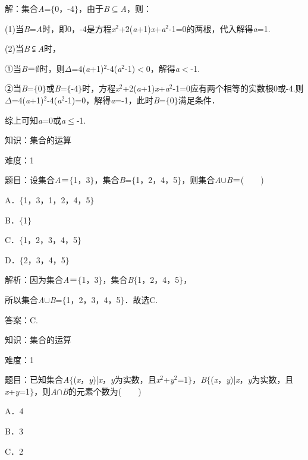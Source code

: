 \documentclass{article} %
\begin{document}
解：集合\textit{A}=$\mathrm{\{}$0，-4$\mathrm{\}}$，由于\textit{B}$\mathrm{\subseteq}$\textit{A}，则：

(1)当\textit{B}=\textit{A}时，即0，-4是方程\textit{x}${}^{2}$+2(\textit{a}+1)\textit{x}+\textit{a}${}^{2}$-1=0的两根，代入解得\textit{a}=1.

(2)当\textit{B}$\subsetneqq$\textit{A}时，

①当\textit{B}＝$\mathrm{\emptyset}$时，则$\Delta$=4(\textit{a}+1)${}^{2}$-4(\textit{a}${}^{2}$-1)$\mathrm{<}$0，解得\textit{a}$\mathrm{<}$-1.

②当\textit{B}=$\mathrm{\{}$0$\mathrm{\}}$或\textit{B}=$\mathrm{\{}$-4$\mathrm{\}}$时，方程\textit{x}${}^{2}$+2(\textit{a}+1)\textit{x}+\textit{a}${}^{2}$-1=0应有两个相等的实数根0或-4.则$\Delta$=4(\textit{a}+1)${}^{2}$-4(\textit{a}${}^{2}$-1)=0，解得\textit{a}=-1，此时\textit{B}=$\mathrm{\{}$0$\mathrm{\}}$满足条件．

综上可知\textit{a}=0或\textit{a}$\mathrm{\le}$-1.

知识：集合的运算

难度：1

题目：设集合\textit{A}＝$\mathrm{\{}$1，3$\mathrm{\}}$，集合\textit{B}=$\mathrm{\{}$1，2，4，5$\mathrm{\}}$，则集合\textit{A}$\mathrm{\cup}$\textit{B}＝(　　)

A．$\mathrm{\{}$1，3，1，2，4，5$\mathrm{\}}$  

B．$\mathrm{\{}$1$\mathrm{\}}$

C．$\mathrm{\{}$1，2，3，4，5$\mathrm{\}}$   

D．$\mathrm{\{}$2，3，4，5$\mathrm{\}}$

解析：因为集合\textit{A}＝$\mathrm{\{}$1，3$\mathrm{\}}$，集合\textit{B}$\mathrm{\{}$1，2，4，5$\mathrm{\}}$，

所以集合\textit{A}$\mathrm{\cup}$\textit{B}=$\mathrm{\{}$1，2，3，4，5$\mathrm{\}}$．故选C.

答案：C.

知识：集合的运算

难度：1

题目：已知集合\textit{A}$\mathrm{\{}$(\textit{x}，\textit{y})|\textit{x}，\textit{y}为实数，且\textit{x}${}^{2}$+\textit{y}${}^{2}$=1$\mathrm{\}}$，\textit{B}$\mathrm{\{}$(\textit{x}，\textit{y})|\textit{x}，\textit{y}为实数，且\textit{x}+\textit{y}=1$\mathrm{\}}$，则\textit{A}$\mathrm{\cap}$\textit{B}的元素个数为(　　)

A．4　　　　

B．3　　　　

C．2　　　　
\end{document}
